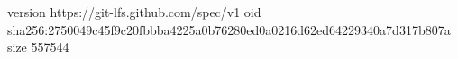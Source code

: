 version https://git-lfs.github.com/spec/v1
oid sha256:2750049c45f9c20fbbba4225a0b76280ed0a0216d62ed64229340a7d317b807a
size 557544
